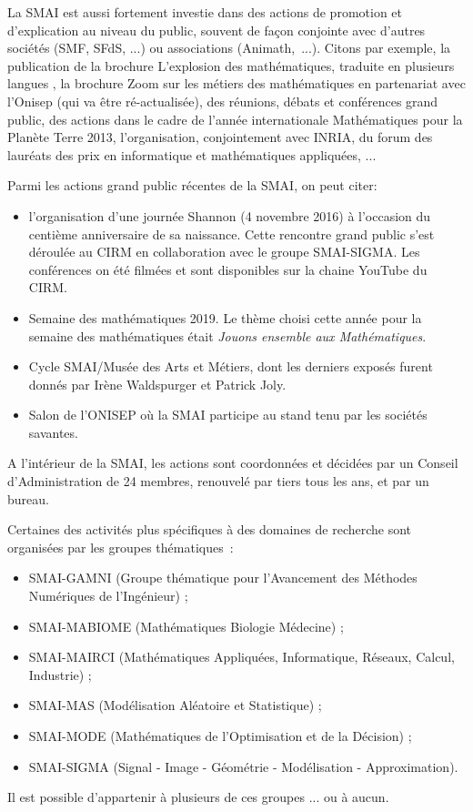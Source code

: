 La SMAI est aussi fortement investie dans des actions
de promotion et d'explication au niveau du public,
souvent de fa\c con conjointe avec d'autres soci\'et\'es
(SMF, SFdS, ...) ou associations (Animath,~...).  Citons
par exemple, la publication de la brochure \og L'explosion
des math\'ematiques\fg{}, traduite en plusieurs langues
, la brochure \og Zoom sur les m\'etiers
des math\'ematiques\fg{} en partenariat avec l'Onisep (qui va \^etre r\'e-actualis\'ee),
des r\'eunions, d\'ebats et conf\'erences grand public, des actions
dans le cadre de l'ann\'ee internationale
\og Math\'ematiques pour la Plan\`ete Terre 2013\fg{},
l'organisation, conjointement avec INRIA, du
\og forum des laur\'eats des prix en informatique
et math\'ematiques appliqu\'ees\fg{}, ...

Parmi les actions grand public r\'ecentes de la SMAI, on peut citer:
\begin{itemize}
 \item l'organisation d'une journ\'ee Shannon (4 novembre 2016) \`a l'occasion du centi\`eme anniversaire de sa naissance.
 Cette rencontre grand public s'est d\'eroul\'ee au CIRM en collaboration avec le groupe SMAI-SIGMA.
Les conf\'erences on \'et\'e  film\'ees et sont disponibles sur la chaine YouTube du CIRM.
\item Semaine des math\'ematiques 2019. Le th\`eme choisi cette ann\'ee pour la semaine des math\'ematiques \'etait \textit{Jouons ensemble aux Math\'ematiques}.
\item Cycle SMAI/Mus\'ee des Arts et M\'etiers, dont les derniers expos\'es furent donn\'es par Ir\`ene Waldspurger et Patrick Joly. 
\item Salon de l'ONISEP o\`u la SMAI participe au stand tenu par les soci\'et\'es savantes.
\end{itemize}

A l'int\'erieur de la SMAI, les actions sont coordonn\'ees et d\'ecid\'ees par un
Conseil d'Administration de 24 membres, renouvel\'e par tiers tous
les ans, et par un bureau.

Certaines des activit\'es plus sp\'ecifiques
\`a des domaines de recherche sont organis\'ees
par les groupes th\'ematiques~:
\begin{itemize}%
    \item SMAI-GAMNI (Groupe th\'ematique pour l'Avancement des M\'ethodes Num\'eriques de l'Ing\'enieur) ;
    \item SMAI-MABIOME (Math\'ematiques Biologie M\'edecine) ;
    \item SMAI-MAIRCI (Math\'ematiques Appliqu\'ees, Informatique, R\'eseaux, Calcul, Industrie) ;
    \item SMAI-MAS (Mod\'elisation Al\'eatoire et Statistique) ;
    \item SMAI-MODE  (Math\'ematiques de l'Optimisation et de la D\'ecision) ;
    \item SMAI-SIGMA (Signal - Image - G\'eom\'etrie - Mod\'elisation - Approximation).
\end{itemize}
Il est possible d'appartenir \`a plusieurs de ces groupes ... ou \`a aucun.



